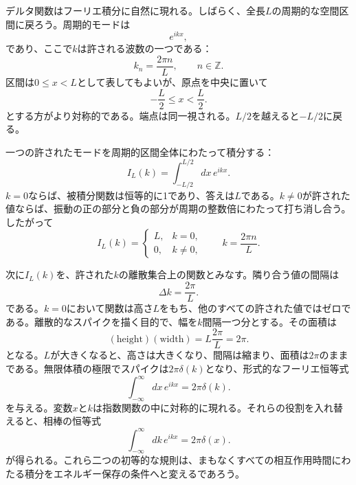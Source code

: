 デルタ関数はフーリエ積分に自然に現れる。しばらく、全長\(L\)の周期的な空間区間に戻ろう。周期的モードは
\begin{equation}
e^{ikx},
\end{equation}
であり、ここで\(k\)は許される波数の一つである：
\begin{equation}
k_n=\frac{2\pi n}{L},
\qquad n\in\mathbb Z.
\end{equation}
区間は\(0\leq x<L\)として表してもよいが、原点を中央に置いて
\begin{equation}
-\frac L2\leq x<\frac L2.
\end{equation}
とする方がより対称的である。端点は同一視される。\(L/2\)を越えると\(-L/2\)に戻る。

一つの許されたモードを周期的区間全体にわたって積分する：
\begin{equation}
I_L(k)=\int_{-L/2}^{L/2}dx\,e^{ikx}.
\end{equation}
\(k=0\)ならば、被積分関数は恒等的に1であり、答えは\(L\)である。\(k\neq0\)が許された値ならば、振動の正の部分と負の部分が周期の整数倍にわたって打ち消し合う。したがって
\begin{equation}
I_L(k)=
\begin{cases}
L,&k=0,\\[4pt]
0,&k\neq0,
\end{cases}
\qquad
k=\frac{2\pi n}{L}.
\end{equation}

次に\(I_L(k)\)を、許された\(k\)の離散集合上の関数とみなす。隣り合う値の間隔は
\begin{equation}
\Delta k=\frac{2\pi}{L}.
\end{equation}
である。\(k=0\)において関数は高さ\(L\)をもち、他のすべての許された値ではゼロである。離散的なスパイクを描く目的で、幅を\(k\)間隔一つ分とする。その面積は
\begin{equation}
(\text{height})(\text{width})
=L\frac{2\pi}{L}=2\pi.
\end{equation}
となる。\(L\)が大きくなると、高さは大きくなり、間隔は縮まり、面積は\(2\pi\)のままである。無限体積の極限でスパイクは\(2\pi\delta(k)\)となり、形式的なフーリエ恒等式
\begin{equation}
\int_{-\infty}^{\infty}dx\,e^{ikx}=2\pi\delta(k).
\end{equation}
を与える。変数\(x\)と\(k\)は指数関数の中に対称的に現れる。それらの役割を入れ替えると、相棒の恒等式
\begin{equation}
\int_{-\infty}^{\infty}dk\,e^{ikx}=2\pi\delta(x).
\end{equation}
が得られる。これら二つの初等的な規則は、まもなくすべての相互作用時間にわたる積分をエネルギー保存の条件へと変えるであろう。

